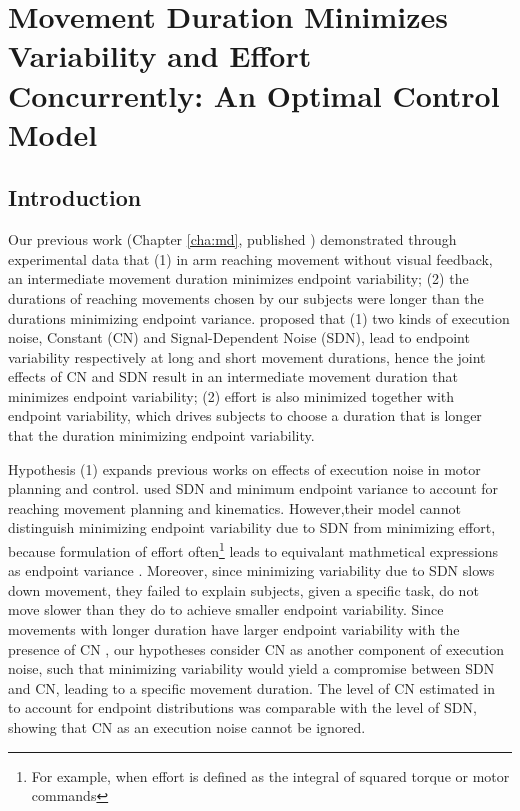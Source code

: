 \chapter{Movement Duration Minimizes Variability and Effort Concurrently: An Optimal Control Model}
\label{cha:ocmd}

\section{Introduction}
Our previous work (Chapter \ref{cha:md}, published \cite{Wang2016}) demonstrated through experimental data that 
(1) in arm reaching movement without visual feedback, an intermediate movement duration minimizes endpoint variability; 
(2) the durations of reaching movements chosen by our subjects were longer than the durations minimizing endpoint variance. 
\cite{Wang2016} proposed that 
(1) two kinds of execution noise, Constant (CN) and Signal-Dependent Noise (SDN), lead to endpoint variability respectively at long and short movement durations, hence the joint effects of CN and SDN result in an intermediate movement duration that minimizes endpoint variability;
(2) effort is also minimized together with endpoint variability, which drives subjects to choose a duration that is longer that the duration minimizing endpoint variability.

Hypothesis (1) expands previous works on effects of execution noise in motor planning and control.
\cite{Harris1998, Harris2006} used SDN and minimum endpoint variance to account for reaching movement planning and kinematics. 
However,their model cannot distinguish minimizing endpoint variability due to SDN from minimizing effort, because formulation of effort often\footnote{For example, when effort is defined as the integral of squared torque or motor commands} leads to equivalant mathmetical expressions as endpoint variance \cite{Wang2016, OSullivan2009}. 
Moreover, since minimizing variability due to SDN slows down movement, they failed to explain subjects, given a specific task, do not move slower than they do to achieve smaller endpoint variability.
Since movements with longer duration have larger endpoint variability with the presence of CN \cite{Todorov2005}, our hypotheses consider CN as another component of execution noise, such that minimizing variability would yield a compromise between SDN and CN, leading to a specific movement duration. 
The level of CN estimated in \cite{VanBeers2004} to account for endpoint distributions was comparable with the level of SDN, showing that CN as an execution noise cannot be ignored.

